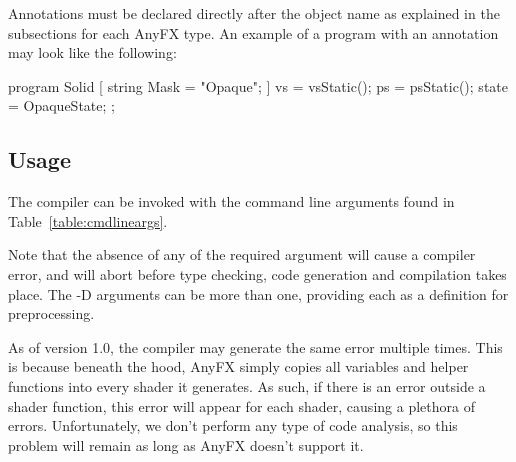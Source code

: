 \documentclass{article}
\begin{document}
\begin{CodeBox}
	[ string Mask = "Opaque"; ]
\end{CodeBox}

Annotations must be declared directly after the object name as explained in the subsections for each AnyFX type. An example of a program with an annotation may look like the following:

\begin{CodeBox}
program Solid [ string Mask = "Opaque"; ]
{
	vs = vsStatic();
	ps = psStatic();
	state = OpaqueState;
};
\end{CodeBox}

\subsection{Usage}
The compiler can be invoked with the command line arguments found in Table~\ref{table:cmdlineargs}.

\begin{table}[float]
\caption{Shader Dependencies}
\label{table:cmdlineargs}
\end{table}

Note that the absence of any of the required argument will cause a compiler error, and will abort before type checking, code generation and compilation takes place. The -D arguments can be more than one, providing each as a definition for preprocessing. 

As of version 1.0, the compiler may generate the same error multiple times. This is because beneath the hood, AnyFX simply copies all variables and helper functions into every shader it generates. As such, if there is an error outside a shader function, this error will appear for each shader, causing a plethora of errors. Unfortunately, we don't perform any type of code analysis, so this problem will remain as long as AnyFX doesn't support it.
\end{document}
